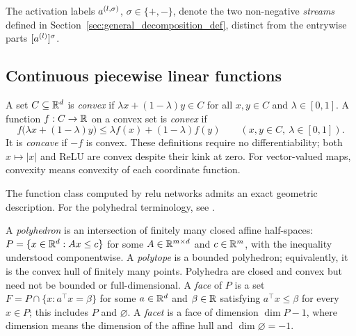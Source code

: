 \begin{remark}\label{rem:pair_notation}
The activation labels $a^{(l,\sigma)}$, $\sigma \in \{+,-\}$, denote the two non-negative \emph{streams} defined in Section~\ref{sec:general_decomposition_def}, distinct from the entrywise parts $[a^{(l)}]^{\sigma}$.
\end{remark}

\subsection*{Continuous piecewise linear functions}

\begin{definition}\label{def:convexity}
A set $C\subseteq\mathbb{R}^d$ is \emph{convex} if $\lambda x+(1-\lambda)y\in C$ for all $x,y\in C$ and $\lambda\in[0,1]$. A function $f:C\to\mathbb{R}$ on a convex set is \emph{convex} if
\[
f\bigl(\lambda x+(1-\lambda)y\bigr)\le\lambda f(x)+(1-\lambda)f(y)
\qquad(x,y\in C,\ \lambda\in[0,1]).
\]
It is \emph{concave} if $-f$ is convex. These definitions require no differentiability; both $x\mapsto|x|$ and ReLU are convex despite their kink at zero. For vector-valued maps, convexity means convexity of each coordinate function.
\end{definition}

The function class computed by \ac{relu} networks admits an exact geometric description. For the polyhedral terminology, see \textcite[Chapters~1--2 and Section~5.1]{Ziegler1995}.

\begin{definition}\label{def:polyhedron_polytope}
A \emph{polyhedron} is an intersection of finitely many closed affine half-spaces: $P=\{x\in\mathbb{R}^d:Ax\le c\}$ for some $A\in\mathbb{R}^{m\times d}$ and $c\in\mathbb{R}^m$, with the inequality understood componentwise. A \emph{polytope} is a bounded polyhedron; equivalently, it is the convex hull of finitely many points. Polyhedra are closed and convex but need not be bounded or full-dimensional.
A \emph{face} of $P$ is a set $F=P\cap\{x:a^\top x=\beta\}$ for some $a\in\mathbb{R}^d$ and $\beta\in\mathbb{R}$ satisfying $a^\top x\le\beta$ for every $x\in P$; this includes $P$ and $\varnothing$. A \emph{facet} is a face of dimension $\dim P-1$, where dimension means the dimension of the affine hull and $\dim\varnothing=-1$.
\end{definition}

